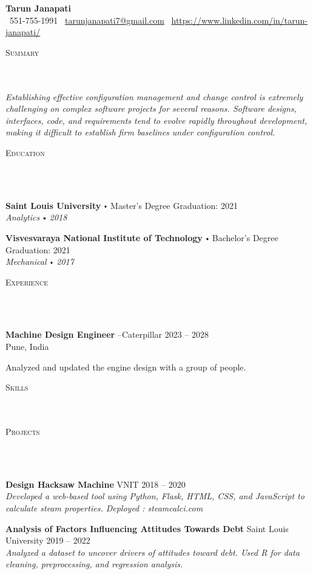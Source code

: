 \documentclass{article}
\newcommand{\school}[4]{
      \textbf{#1} \labelitemi #2 \hfill #3 \\ #4 \vspace*{5pt}
    }
\newcommand{\employer}[4]{{
      \vspace*{2pt}%
      \textbf{#1} #2 \hfill #3\\ #4 \vspace*{2pt}}
      }
\newcommand{\project}[4]{{
        \vspace*{2pt}%
        \textbf{#1} #2 \hfill #3\\ \textit{#4} \vspace*{2pt}}
        }
\newcommand{\lineunder}{
      \vspace*{-8pt} \\ \hspace*{-18pt} 
      \hrulefill \\
      }
\newcommand{\header}[1]{{
      \hspace*{-15pt}\vspace*{6pt} \textsc{#1}} \vspace*{-6pt} 
      \lineunder
      }
\renewcommand{\labelitemi}{
      $\vcenter{\hbox{\tiny$\bullet$}}$\hspace*{3pt}
      }
\renewcommand{\labelitemii}{
      $\vcenter{\hbox{\tiny$\bullet$}}$\hspace*{-3pt}
      }
\newenvironment{bullet-list-minor}{
        \begin{list}{\labelitemii}{\setlength\leftmargin{15pt} 
          \topsep 0pt \itemsep -2pt}}{\vspace*{4pt}\end{list}
          }
\begin{document}
    \small
    \smallskip
    \vspace*{-44pt}

    \begin{center}
      {\LARGE \textbf{Tarun Janapati}} \\
      \faPhone\ 551-755-1991 \quad
      \faEnvelope\ \href{mailto:tarunjanapati7@gmail.com}{tarunjanapati7@gmail.com} \quad
      \faLinkedin\ \url{https://www.linkedin.com/in/tarun-janapati/}
    \end{center}
   \vspace*{4pt}%
    \header{Summary}

    {
      \textit{Establishing effective configuration management and change control is extremely challenging on complex software projects for several reasons. Software designs, interfaces, code, and requirements tend to evolve rapidly throughout development, making it difficult to establish firm baselines under configuration control.}
      }

    \vspace{15pt}

   \header{Education}

    {
      \school{Saint Louis University}{Master's Degree}{Graduation: 2021}{\textit{Analytics \labelitemi 2018}}
      

      \school{Visvesvaraya National Institute of Technology}{Bachelor's Degree}{Graduation: 2021}{\textit{Mechanical \labelitemi 2017}}
      }

    \vspace*{4pt}%
    \header{Experience}

    {
        \employer{Machine Design Engineer}{--Caterpillar}{2023 -- 2028}{Pune, India}
        \begin{bullet-list-minor}
	      \item Analyzed and updated the engine design with a group of people.
        \end{bullet-list-minor}
       
      }
    \vspace*{4pt}%
    \header{Skills}

    \vspace*{4pt}%
    \header{Projects}
    {
      \project{Design Hacksaw Machine}{VNIT}{2018 -- 2020}{Developed a web-based tool using Python, Flask, HTML, CSS, and JavaScript to calculate steam properties.
Deployed : steamcalci.com}
      

      \project{Analysis of Factors Influencing Attitudes Towards Debt}{Saint Louis University}{2019 -- 2022}{Analyzed a dataset to uncover drivers of attitudes toward debt. Used R for data cleaning, preprocessing, and
regression analysis.}
      }
\end{document}
